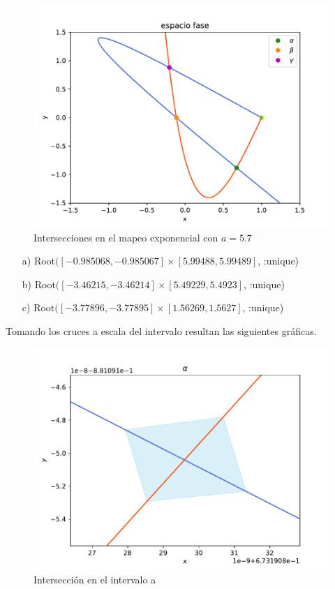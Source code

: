 \begin{figure}[H]
\centering
\includegraphics[scale=0.5]{cruces_jung1}
\caption{Intersecciones en el mapeo exponencial con $a=5.7$}
\label{jung_cortes}
\end{figure}
\begin{itemize}
\item[a)] Root$([-0.985068, -0.985067] \times [5.99488, 5.99489]$, :unique)
\item[b)] Root$([-3.46215, -3.46214] \times [5.49229, 5.4923]$, :unique)
\item[c)] Root$([-3.77896, -3.77895] \times [1.56269, 1.5627]$, :unique)
\end{itemize}
Tomando los cruces a escala del intervalo resultan las siguientes gráficas.

\begin{figure}[H]
\centering
\includegraphics[scale=0.4]{cruce_a}
\caption{Intersección en el intervalo a}
\label{jung_corte1}
\end{figure}


